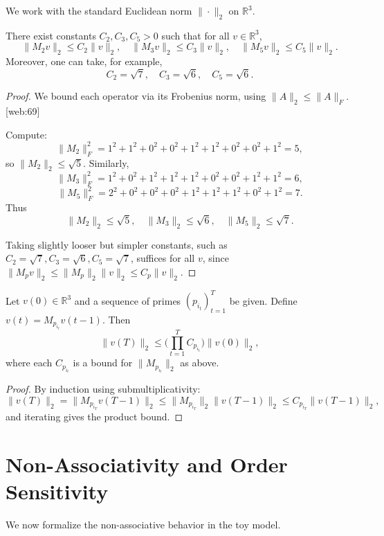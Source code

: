 \documentclass[11pt]{article}
\begin{document}
We work with the standard Euclidean norm \(\|\cdot\|_2\) on \(\mathbb{R}^3\).

\begin{lemma}[Bounds on \(\|M_p\|_2\)]
There exist constants \(C_2, C_3, C_5 > 0\) such that for all \(v \in \mathbb{R}^3\),
\[
  \|M_2 v\|_2 \le C_2 \|v\|_2,\quad
  \|M_3 v\|_2 \le C_3 \|v\|_2,\quad
  \|M_5 v\|_2 \le C_5 \|v\|_2.
\]
Moreover, one can take, for example,
\[
  C_2 = \sqrt{7},\quad C_3 = \sqrt{6},\quad C_5 = \sqrt{6}.
\]
\end{lemma}

\begin{proof}
We bound each operator via its Frobenius norm, using \(\|A\|_2 \le \|A\|_F\). [web:69]

Compute:
\[
  \|M_2\|_F^2 =
  1^2 + 1^2 + 0^2 + 0^2 + 1^2 + 1^2 + 0^2 + 0^2 + 1^2
  = 5,
\]
so \(\|M_2\|_2 \le \sqrt{5}\).
Similarly,
\[
  \|M_3\|_F^2 =
  1^2 + 0^2 + 1^2 + 1^2 + 1^2 + 0^2 + 0^2 + 1^2 + 1^2 = 6,
\]
\[
  \|M_5\|_F^2 =
  2^2 + 0^2 + 0^2 + 0^2 + 1^2 + 1^2 + 1^2 + 0^2 + 1^2 = 7.
\]
Thus
\[
  \|M_2\|_2 \le \sqrt{5},\quad
  \|M_3\|_2 \le \sqrt{6},\quad
  \|M_5\|_2 \le \sqrt{7}.
\]

Taking slightly looser but simpler constants, such as
\(C_2 = \sqrt{7}, C_3 = \sqrt{6}, C_5 = \sqrt{7}\), suffices for all \(v\), since \(\|M_p v\|_2 \le \|M_p\|_2\|v\|_2 \le C_p \|v\|_2\).
\end{proof}

\begin{corollary}
Let \(v(0) \in \mathbb{R}^3\) and a sequence of primes \((p_{i_t})_{t=1}^T\) be given.
Define \(v(t) = M_{p_{i_t}} v(t-1)\).
Then
\[
  \|v(T)\|_2 \le \Big(\prod_{t=1}^T C_{p_{i_t}}\Big) \|v(0)\|_2,
\]
where each \(C_{p_{i_t}}\) is a bound for \(\|M_{p_{i_t}}\|_2\) as above.
\end{corollary}

\begin{proof}
By induction using submultiplicativity:
\[
  \|v(T)\|_2 = \|M_{p_{i_T}} v(T-1)\|_2
  \le \|M_{p_{i_T}}\|_2 \|v(T-1)\|_2
  \le C_{p_{i_T}} \|v(T-1)\|_2,
\]
and iterating gives the product bound.
\end{proof}

\section{Non-Associativity and Order Sensitivity}

We now formalize the non-associative behavior in the toy model.
\end{document}
